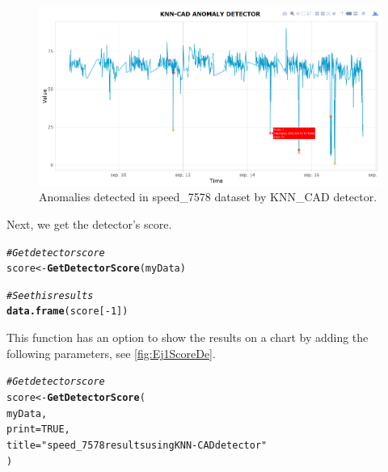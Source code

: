 \documentclass[a4paper]{article}\usepackage[]{graphicx}\usepackage[]{color}
\makeatletter
\newcommand{\hlnum}[1]{\textcolor[rgb]{0.686,0.059,0.569}{#1}}%
\newcommand{\hlstr}[1]{\textcolor[rgb]{0.192,0.494,0.8}{#1}}%
\newcommand{\hlcom}[1]{\textcolor[rgb]{0.678,0.584,0.686}{\textit{#1}}}%
\newcommand{\hlopt}[1]{\textcolor[rgb]{0,0,0}{#1}}%
\newcommand{\hlstd}[1]{\textcolor[rgb]{0.345,0.345,0.345}{#1}}%
\newcommand{\hlkwb}[1]{\textcolor[rgb]{0.69,0.353,0.396}{#1}}%
\newcommand{\hlkwc}[1]{\textcolor[rgb]{0.333,0.667,0.333}{#1}}%
\newcommand{\hlkwd}[1]{\textcolor[rgb]{0.737,0.353,0.396}{\textbf{#1}}}%
\newenvironment{kframe}{%
 \def\at@end@of@kframe{}%
 \ifinner\ifhmode%
  \def\at@end@of@kframe{\end{minipage}}%
  \begin{minipage}{\columnwidth}%
 \fi\fi%
 \def\FrameCommand##1{\hskip\@totalleftmargin \hskip-\fboxsep
 \colorbox{shadecolor}{##1}\hskip-\fboxsep
     \hskip-\linewidth \hskip-\@totalleftmargin \hskip\columnwidth}%
 \MakeFramed {\advance\hsize-\width
   \@totalleftmargin\z@ \linewidth\hsize
   \@setminipage}}%
 {\par\unskip\endMakeFramed%
 \at@end@of@kframe}
\newenvironment{knitrout}{}{} %
\makeatother
\begin{document}
\begin{figure}[htbp]
\centering
\includegraphics[width=1\linewidth]{Example1Score.PNG}
\caption{Anomalies detected in speed_7578 dataset by KNN_CAD detector.}
\label{fig:Example1Score}
\end{figure}


Next, we get the detector's score.

\begin{knitrout}
\color{fgcolor}\begin{kframe}
\begin{alltt}
\hlcom{# Get detector score}
\hlstd{score} \hlkwb{<-} \hlkwd{GetDetectorScore}\hlstd{(myData)}

\hlcom{# See this results}
\hlkwd{data.frame}\hlstd{(score[}\hlopt{-}\hlnum{1}\hlstd{])}
\end{alltt}
\end{kframe}
\end{knitrout}

This function has an option to show the results on a chart by adding the following parameters, see \ref{fig:Ej1ScoreDe}.

\begin{knitrout}
\color{fgcolor}\begin{kframe}
\begin{alltt}
\hlcom{# Get detector score}
\hlstd{score} \hlkwb{<-} \hlkwd{GetDetectorScore}\hlstd{(}
  \hlstd{myData,}
  \hlkwc{print} \hlstd{=} \hlnum{TRUE}\hlstd{,}
  \hlkwc{title} \hlstd{=} \hlstr{"speed_7578 results using KNN-CAD detector"}
\hlstd{)}
\end{alltt}
\end{kframe}
\end{knitrout}
\end{document}
